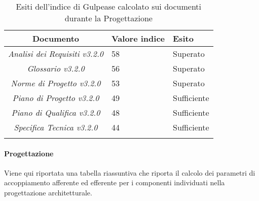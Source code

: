 \begin{longtable}{|c|p{3cm}|p{3cm}|}
\toprule
\textbf{Documento} & \textbf{Valore indice} & \textbf{Esito} \\


\midrule
\emph{Analisi dei Requisiti v3.2.0} & 58 & Superato \\
\midrule
\emph{Glossario v3.2.0} & 56 & Superato \\
\midrule
\emph{Norme di Progetto v3.2.0} & 53  & Superato\\
\midrule
\emph{Piano di Progetto v3.2.0} & 49  & Sufficiente\\
\midrule
\emph{Piano di Qualifica v3.2.0} & 48  & Sufficiente\\
\midrule
\emph{Specifica Tecnica v3.2.0} & 44 & Sufficiente\\
\bottomrule
\caption{Esiti dell'indice di Gulpease calcolato sui documenti durante la Progettazione}
\label{tab:changelog}
\end{longtable}

\paragraph{Progettazione}
Viene qui riportata una tabella riassuntiva che riporta il calcolo dei parametri di accoppiamento afferente ed efferente per i componenti individuati nella progettazione architetturale.

